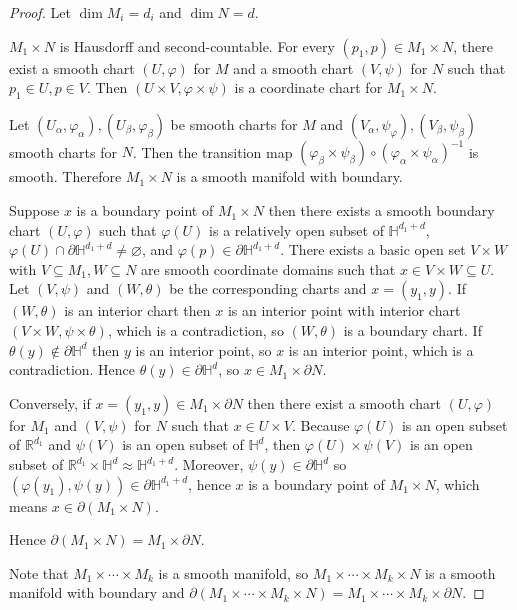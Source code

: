 \begin{proof}
    Let \( \dim M_{i} = d_{i} \) and \( \dim N = d \).

    \( M_{1} \times N \) is Hausdorff and second-countable. For every \( (p_{1}, p) \in M_{1} \times N \), there exist a smooth chart \( (U, \varphi) \) for \( M \) and a smooth chart \( (V, \psi) \) for \( N \) such that \( p_{1} \in U, p \in V \). Then \( (U \times V, \varphi \times \psi) \) is a coordinate chart for \( M_{1} \times N \).

    Let \( (U_{\alpha}, \varphi_{\alpha}), (U_{\beta}, \varphi_{\beta}) \) be smooth charts for \( M \) and \( (V_{\alpha}, \psi_{\varphi}), (V_{\beta}, \psi_{\beta}) \) smooth charts for \( N \). Then the transition map \( (\varphi_{\beta} \times \psi_{\beta}) \circ {(\varphi_{\alpha} \times \psi_{\alpha})}^{-1} \) is smooth. Therefore \( M_{1} \times N \) is a smooth manifold with boundary.

    Suppose \( x \) is a boundary point of \( M_{1} \times N \) then there exists a smooth boundary chart \( (U, \varphi) \) such that \( \varphi(U) \) is a relatively open subset of \( \mathbb{H}^{d_{1} + d} \), \( \varphi(U) \cap \partial \mathbb{H}^{d_{1} + d} \ne \varnothing \), and \( \varphi(p) \in \partial \mathbb{H}^{d_{1} + d} \). There exists a basic open set \( V \times W \) with \( V \subseteq M_{1}, W \subseteq N \) are smooth coordinate domains such that \( x \in V \times W \subseteq U \). Let \( (V, \psi) \) and \( (W, \theta) \) be the corresponding charts and \( x = (y_{1}, y) \). If \( (W, \theta) \) is an interior chart then \( x \) is an interior point with interior chart \( (V \times W, \psi \times \theta) \), which is a contradiction, so \( (W, \theta) \) is a boundary chart. If \( \theta(y) \notin \partial \mathbb{H}^{d} \) then \( y \) is an interior point, so \( x \) is an interior point, which is a contradiction. Hence \( \theta(y) \in \partial \mathbb{H}^{d} \), so \( x \in M_{1} \times \partial N \).

    Conversely, if \( x = (y_{1}, y) \in M_{1} \times \partial N \) then there exist a smooth chart \( (U, \varphi) \) for \( M_{1} \) and \( (V, \psi) \) for \( N \) such that \( x \in U \times V \). Because \( \varphi(U) \) is an open subset of \( \mathbb{R}^{d_{1}} \) and \( \psi(V) \) is an open subset of \( \mathbb{H}^{d} \), then \( \varphi(U) \times \psi(V) \) is an open subset of \( \mathbb{R}^{d_{1}} \times \mathbb{H}^{d} \approx \mathbb{H}^{d_{1} + d} \). Moreover, \( \psi(y) \in \partial \mathbb{H}^{d} \) so \( (\varphi(y_{1}), \psi(y)) \in \partial \mathbb{H}^{d_{1} + d} \), hence \( x \) is a boundary point of \( M_{1} \times N \), which means \( x \in \partial (M_{1} \times N) \).

    Hence \( \partial (M_{1} \times N) = M_{1} \times \partial N \).

    \bigskip

    Note that \( M_{1} \times \cdots \times M_{k} \) is a smooth manifold, so \( M_{1} \times \cdots \times M_{k} \times N \) is a smooth manifold with boundary and \( \partial (M_{1} \times \cdots \times M_{k} \times N) = M_{1} \times \cdots \times M_{k} \times \partial N \).
\end{proof}
